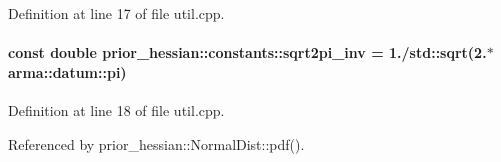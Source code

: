 Definition at line 17 of file util.\+cpp.

\paragraph[{\texorpdfstring{sqrt2pi\+\_\+inv}{sqrt2pi_inv}}]{\setlength{\rightskip}{0pt plus 5cm}const double prior\+\_\+hessian\+::constants\+::sqrt2pi\+\_\+inv = 1./std\+::sqrt(2.$\ast$arma\+::datum\+::pi)}\hypertarget{namespaceprior__hessian_1_1constants_a7a6ae61175a9b764667984ec36da24bd}{}\label{namespaceprior__hessian_1_1constants_a7a6ae61175a9b764667984ec36da24bd}


Definition at line 18 of file util.\+cpp.



Referenced by prior\+\_\+hessian\+::\+Normal\+Dist\+::pdf().

